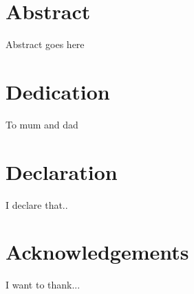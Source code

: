 \documentclass[a4paper]{report}
\begin{document}


\chapter*{Abstract}
Abstract goes here

\chapter*{Dedication}
To mum and dad

\chapter*{Declaration}
I declare that..

\chapter*{Acknowledgements}
I want to thank...

\tableofcontents

\appendix
\end{document}
